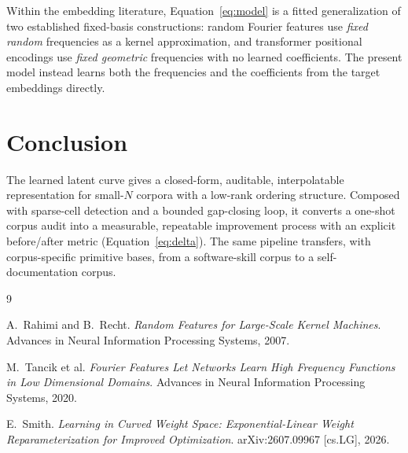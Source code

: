 \documentclass[11pt]{article}
\begin{document}
Within the embedding literature, Equation~\ref{eq:model} is a fitted
generalization of two established fixed-basis constructions: random Fourier
features \citep{rahimi2007} use \emph{fixed random} frequencies as a kernel
approximation, and transformer positional encodings \citep{tancik2020} use
\emph{fixed geometric} frequencies with no learned coefficients. The present
model instead learns both the frequencies and the coefficients from the
target embeddings directly.

\section{Conclusion}

The learned latent curve gives a closed-form, auditable, interpolatable
representation for small-$N$ corpora with a low-rank ordering structure.
Composed with sparse-cell detection and a bounded gap-closing loop, it
converts a one-shot corpus audit into a measurable, repeatable improvement
process with an explicit before/after metric (Equation~\ref{eq:delta}). The
same pipeline transfers, with corpus-specific primitive bases, from a
software-skill corpus to a self-documentation corpus.

\begin{thebibliography}{9}

A.~Rahimi and B.~Recht.
\emph{Random Features for Large-Scale Kernel Machines}.
Advances in Neural Information Processing Systems, 2007.

M.~Tancik et al.
\emph{Fourier Features Let Networks Learn High Frequency Functions in Low
Dimensional Domains}.
Advances in Neural Information Processing Systems, 2020.

E.~Smith.
\emph{Learning in Curved Weight Space: Exponential-Linear Weight
Reparameterization for Improved Optimization}.
arXiv:2607.09967 [cs.LG], 2026.

\end{thebibliography}
\end{document}
